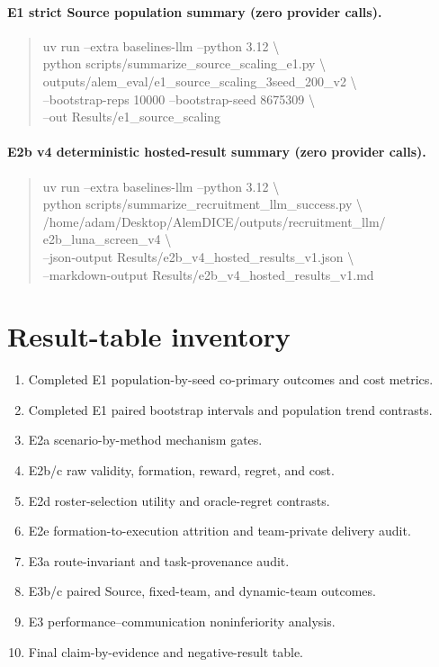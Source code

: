 \documentclass[11pt]{article}
\begin{document}
\paragraph{E1 strict Source population summary (zero provider calls).}
\begin{quote}
\small\ttfamily\raggedright
uv run --extra baselines-llm --python 3.12 \textbackslash\\
\quad python scripts/summarize\_source\_scaling\_e1.py \textbackslash\\
\quad outputs/alem\_eval/e1\_source\_scaling\_3seed\_200\_v2
\textbackslash\\
\quad --bootstrap-reps 10000 --bootstrap-seed 8675309 \textbackslash\\
\quad --out Results/e1\_source\_scaling
\end{quote}

\paragraph{E2b v4 deterministic hosted-result summary (zero provider calls).}
\begin{quote}
\small\ttfamily\raggedright
uv run --extra baselines-llm --python 3.12 \textbackslash\\
\quad python scripts/summarize\_recruitment\_llm\_success.py \textbackslash\\
\quad /home/adam/Desktop/AlemDICE/outputs/recruitment\_llm/
e2b\_luna\_screen\_v4 \textbackslash\\
\quad --json-output Results/e2b\_v4\_hosted\_results\_v1.json
\textbackslash\\
\quad --markdown-output Results/e2b\_v4\_hosted\_results\_v1.md
\end{quote}

\section{Result-table inventory}

\begin{enumerate}
  \item Completed E1 population-by-seed co-primary outcomes and cost metrics.
  \item Completed E1 paired bootstrap intervals and population trend contrasts.
  \item E2a scenario-by-method mechanism gates.
  \item E2b/c raw validity, formation, reward, regret, and cost.
  \item E2d roster-selection utility and oracle-regret contrasts.
  \item E2e formation-to-execution attrition and team-private delivery audit.
  \item E3a route-invariant and task-provenance audit.
  \item E3b/c paired Source, fixed-team, and dynamic-team outcomes.
  \item E3 performance--communication noninferiority analysis.
  \item Final claim-by-evidence and negative-result table.
\end{enumerate}
\end{document}
